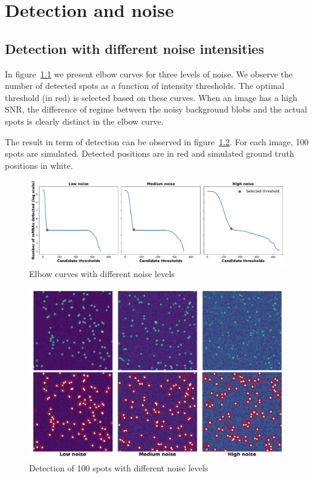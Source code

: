 
\graphicspath{{../../figures/appendix/}}

\chapter{Detection and noise}
\label{ch:appendix_detection}

\newpage

\section{Detection with different noise intensities}
\label{sec:appendix_detection}

\vfill

In figure~\ref{fig:general_spots_elbow} we present elbow curves for three levels of noise.
We observe the number of detected spots as a function of intensity thresholds.
The optimal threshold (in red) is selected based on these curves.
When an image has a high \ac{SNR}, the difference of regime between the noisy background blobs and the actual spots is clearly distinct in the elbow curve.

The result in term of detection can be observed in figure~\ref{fig:general_spots_detection}.
For each image, 100 spots are simulated.
Detected positions are in red and simulated ground truth positions in white.

\vfill

\begin{figure}[h]
    \centering
    \includegraphics[width=1\textwidth]{figures/appendix/spots_elbow}
    \caption[Elbow curves with different noise levels]{Elbow curves with different noise levels}
    \label{fig:general_spots_elbow}
\end{figure}

\begin{figure}[h]
    \centering
    \includegraphics[width=1\textwidth]{figures/appendix/spots_example}
    \caption[Detection of 100 spots with different noise levels]{Detection of 100 spots with different noise levels}
    \label{fig:general_spots_detection}
\end{figure}

